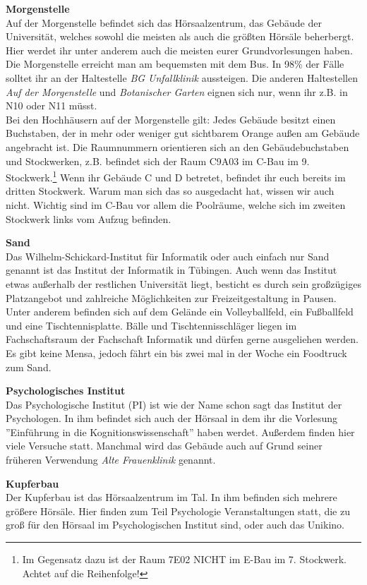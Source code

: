 \textbf{Morgenstelle}\\
Auf der Morgenstelle befindet sich das Hörsaalzentrum, das Gebäude der Universität, welches sowohl die meisten als auch die größten Hörsäle beherbergt. Hier werdet ihr unter anderem auch die meisten eurer Grundvorlesungen haben.\\
Die Morgenstelle erreicht man am bequemsten mit dem Bus. In 98\% der Fälle solltet ihr an der Haltestelle \emph{BG Unfallklinik} aussteigen. Die anderen Haltestellen \emph{Auf der Morgenstelle} und \emph{Botanischer Garten} eignen sich nur, wenn ihr z.B. in N10 oder N11 müsst.\\ Bei den Hochhäusern auf der Morgenstelle gilt: Jedes Gebäude besitzt einen Buchstaben, der in mehr oder weniger gut sichtbarem Orange außen am Gebäude angebracht ist.  Die Raumnummern orientieren sich an den Gebäudebuchstaben und Stockwerken, z.B. befindet sich der Raum C9A03 im C-Bau im 9. Stockwerk.\footnote{Im Gegensatz dazu ist der Raum 7E02 NICHT im E-Bau im 7. Stockwerk. Achtet auf die Reihenfolge!} Wenn ihr Gebäude C und D betretet, befindet ihr euch bereits im dritten Stockwerk. Warum man sich das so ausgedacht hat, wissen wir auch nicht. Wichtig sind im C-Bau vor allem die Poolräume, welche sich im zweiten Stockwerk links vom Aufzug befinden.

\textbf{Sand}\\
Das Wilhelm-Schickard-Institut für Informatik oder auch einfach nur Sand genannt ist das Institut der Informatik in Tübingen. Auch wenn das Institut etwas außerhalb der restlichen Universität liegt, besticht es durch sein großzügiges Platzangebot und zahlreiche Möglichkeiten zur Freizeitgestaltung in Pausen. Unter anderem befinden sich auf dem Gelände ein Volleyballfeld, ein Fußballfeld und eine Tischtennisplatte. Bälle und Tischtennisschläger liegen im Fachschaftsraum der Fachschaft Informatik und dürfen gerne ausgeliehen werden. Es gibt keine Mensa, jedoch fährt ein bis zwei mal in der Woche ein Foodtruck zum Sand.

\textbf{Psychologisches Institut}\\
Das Psychologische Institut (PI) ist wie der Name schon sagt das Institut der Psychologen. In ihm befindet sich auch der Hörsaal in dem ihr die Vorlesung ''Einführung in die Kognitionswissenschaft'' haben werdet. Außerdem finden hier viele Versuche statt. Manchmal wird das Gebäude auch auf Grund seiner früheren Verwendung \textit{Alte Frauenklinik} genannt.

\textbf{Kupferbau}\\
Der Kupferbau ist das Hörsaalzentrum im Tal. In ihm befinden sich mehrere größere Hörsäle. Hier finden zum Teil Psychologie Veranstaltungen statt, die zu groß für den Hörsaal im Psychologischen Institut sind, oder auch das Unikino.

